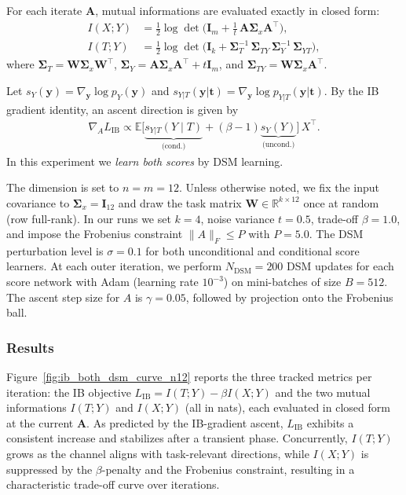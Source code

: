\documentclass[conference]{IEEEtran}
\begin{document}
For each iterate $\bm A$, mutual informations are evaluated exactly in closed form:
\begin{align}
  I(X;Y) &= \frac12 \log\det\!\Big(\bm I_m + \tfrac{1}{t}\, \bm A \bm \Sigma_x \bm A^\top\Big),\\
  I(T;Y) &= \frac12 \log\det\!\Big(\bm I_k + \bm \Sigma_T^{-1}\, \bm \Sigma_{TY}\, \bm \Sigma_Y^{-1}\, \bm \Sigma_{YT}\Big),
\end{align}
where $\bm \Sigma_T = \bm W\bm \Sigma_x \bm W^\top$, $\bm \Sigma_Y = \bm A\bm \Sigma_x \bm A^\top + t \bm I_m$, and $\bm \Sigma_{TY} = \bm W\bm \Sigma_x \bm A^\top$.

Let $s_Y(\bm y) = \nabla_{\bm y} \log p_Y(\bm y)$ and $s_{Y|T}(\bm y|\bm t) = \nabla_{\bm y} \log p_{Y|T}(\bm y|\bm t)$.
By the IB gradient identity, an ascent direction is given by
\begin{align}           
  \nabla_A L_{\mathrm{IB}} \propto
  \mathbb{E}\!\big[\underbrace{s_{Y|T}(Y\!\mid T)}_{\text{(cond.)}}+(\beta-1)\underbrace{s_Y(Y)}_{\text{(uncond.)}}\big]\, X^\top.
\end{align}    
In this experiment we \emph{learn both scores} by DSM learning.

The dimension is set to $n=m=12$.
Unless otherwise noted, we fix the input covariance to 
$\bm \Sigma_x=\bm I_{12}$ and draw the task matrix $\bm W\in\mathbb{R}^{k\times 12}$ once at random (row full-rank).
In our runs we set $k=4$, noise variance $t=0.5$, trade-off $\beta=1.0$, and impose the Frobenius constraint $\|A\|_F\le P$ with $P=5.0$.
The DSM perturbation level is $\sigma=0.1$ for both unconditional and conditional score learners.
At each outer iteration, we perform $N_{\mathrm{DSM}}=200$ DSM updates for each score network with Adam (learning rate $10^{-3}$) on mini-batches of size $B=512$.
The ascent step size for $A$ is $\gamma=0.05$, followed by projection onto the Frobenius ball.

\subsubsection{Results}
Figure~\ref{fig:ib_both_dsm_curve_n12} reports the three tracked metrics per iteration:
the IB objective $L_{\mathrm{IB}}=I(T;Y)-\beta I(X;Y)$ and the two mutual informations $I(T;Y)$ and $I(X;Y)$ (all in nats), 
each evaluated in closed form at the current $\bm A$.
As predicted by the IB-gradient ascent, $L_{\mathrm{IB}}$ exhibits a consistent increase and stabilizes after a transient phase.
Concurrently, $I(T;Y)$ grows as the channel aligns with task-relevant directions, while $I(X;Y)$ is suppressed by the $\beta$-penalty and the Frobenius constraint, resulting in a characteristic trade-off curve over iterations.
\end{document}
